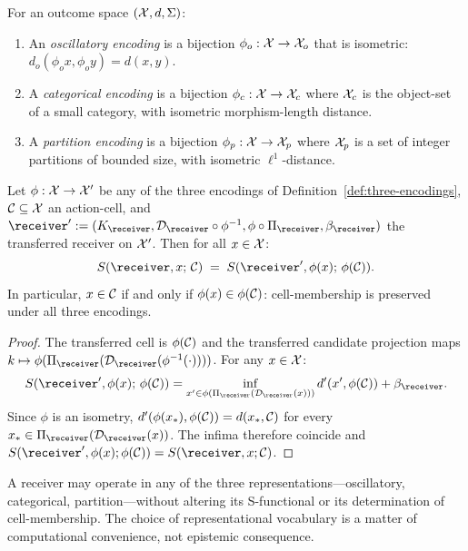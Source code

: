 \begin{definition}\label{def:three-encodings}
For an outcome space $(\mathcal{X}, d, \Sigma)$:
\begin{enumerate}[nosep, label=(\alph*)]
  \item An \emph{oscillatory encoding} is a bijection $\phi_o : \mathcal{X} \to \mathcal{X}_o$ that is isometric: $d_o(\phi_o x, \phi_o y) = d(x,y)$.
  \item A \emph{categorical encoding} is a bijection $\phi_c : \mathcal{X} \to \mathcal{X}_c$ where $\mathcal{X}_c$ is the object-set of a small category, with isometric morphism-length distance.
  \item A \emph{partition encoding} is a bijection $\phi_p : \mathcal{X} \to \mathcal{X}_p$ where $\mathcal{X}_p$ is a set of integer partitions of bounded size, with isometric $\ell^1$-distance.
\end{enumerate}
\end{definition}

\begin{theorem}\label{thm:rep-inv}
Let $\phi : \mathcal{X} \to \mathcal{X}'$ be any of the three encodings of Definition~\ref{def:three-encodings}, $\mathcal{C} \subseteq \mathcal{X}$ an action-cell, and $\receiver' := (K_\receiver, \mathcal{D}_\receiver \circ \phi^{-1}, \phi \circ \Pi_\receiver, \NoiseFloor_\receiver)$ the transferred receiver on $\mathcal{X}'$. Then for all $x \in \mathcal{X}$:
\[
S(\receiver, x;\, \Cell) \;=\; S(\receiver', \phi(x);\, \phi(\Cell)).
\]
In particular, $x \in \mathcal{C}$ if and only if $\phi(x) \in \phi(\mathcal{C})$: cell-membership is preserved under all three encodings.
\end{theorem}

\begin{proof}
The transferred cell is $\phi(\mathcal{C})$ and the transferred candidate projection maps $k \mapsto \phi(\Pi_\receiver(\mathcal{D}_\receiver(\phi^{-1}(\cdot))))$. For any $x \in \mathcal{X}$:
\[
S(\receiver', \phi(x);\, \phi(\Cell))
= \inf_{x' \in \phi(\Pi_\receiver(\mathcal{D}_\receiver(x)))} d'(x', \phi(\Cell)) + \NoiseFloor_\receiver.
\]
Since $\phi$ is an isometry, $d'(\phi(x_*), \phi(\mathcal{C})) = d(x_*, \mathcal{C})$ for every $x_* \in \Pi_\receiver(\mathcal{D}_\receiver(x))$. The infima therefore coincide and $S(\receiver', \phi(x); \phi(\Cell)) = S(\receiver, x; \Cell)$.
\end{proof}

\begin{corollary}\label{cor:triple-S}
A receiver may operate in any of the three representations---oscillatory, categorical, partition---without altering its S-functional or its determination of cell-membership. The choice of representational vocabulary is a matter of computational convenience, not epistemic consequence.
\end{corollary}

